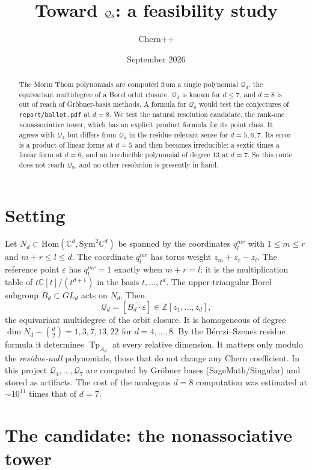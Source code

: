 \documentclass[11pt,a4paper]{article}
\title{\textbf{Toward $\Qd_8$: a feasibility study}}
\author{Chern++}
\date{September 2026}
\newcommand{\Qd}{\mathcal{Q}}
\DeclareMathOperator{\Tp}{Tp}
\theoremstyle{plain}
\begin{document}
\maketitle

\begin{abstract}
The Morin Thom polynomials are computed from a single polynomial $\Qd_d$, the equivariant
multidegree of a Borel orbit closure. $\Qd_d$ is known for $d \le 7$, and $d = 8$ is out of reach
of Gr\"obner-basis methods. A formula for $\Qd_8$ would test the conjectures of
\texttt{report/ballot.pdf} at $d = 8$. We test the natural resolution candidate, the rank-one
nonassociative tower, which has an explicit product formula for its point class. It agrees
with $\Qd_4$ but differs from $\Qd_d$ in the residue-relevant sense for $d = 5, 6, 7$. Its error
is a product of linear forms at $d = 5$ and then becomes irreducible: a sextic times a linear form
at $d = 6$, and an irreducible polynomial of degree $13$ at $d = 7$. So this route does not
reach $\Qd_8$, and no other resolution is presently in hand.
\end{abstract}

\section{Setting}

Let $N_d \subset \mathrm{Hom}(\mathbb{C}^d, \mathrm{Sym}^2\mathbb{C}^d)$ be spanned by the coordinates
$q^{mr}_l$ with $1 \le m \le r$ and $m + r \le l \le d$. The coordinate $q^{mr}_l$ has torus weight
$z_m + z_r - z_l$. The reference point $\varepsilon$ has $q^{mr}_l = 1$ exactly when $m + r = l$: it
is the multiplication table of $t\mathbb{C}[t]/(t^{d+1})$ in the basis $t, \dots, t^d$. The
upper-triangular Borel subgroup $B_d \subset GL_d$ acts on $N_d$. Then
\[
  \Qd_d = [\overline{B_d \cdot \varepsilon}] \in \mathbb{Z}[z_1, \dots, z_d],
\]
the equivariant multidegree of the orbit closure. It is homogeneous of degree
$\dim N_d - \binom d2 = 1, 3, 7, 13, 22$ for $d = 4, \dots, 8$. By the B\'erczi--Szenes residue formula
it determines $\Tp_{A_d}$ at every relative dimension. It matters only modulo the
\emph{residue-null} polynomials, those that do not change any Chern coefficient. In this project
$\Qd_4, \dots, \Qd_7$ are computed by Gr\"obner bases (SageMath/Singular) and stored as artifacts.
The cost of the analogous $d = 8$ computation was estimated at $\sim 10^{11}$ times that of $d = 7$.

\section{The candidate: the nonassociative tower}
\end{document}
